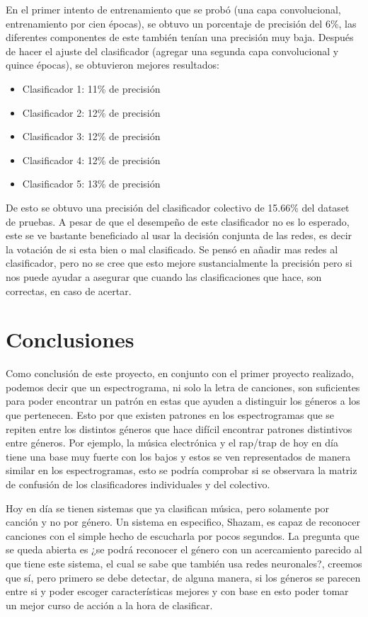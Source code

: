 \documentclass[spanish,11pt,letterpaper]{article}
\begin{document}
En el primer intento de entrenamiento que se probó (una capa convolucional, entrenamiento por cien épocas), se obtuvo un porcentaje de precisión del 6\%, las diferentes componentes de este también tenían una precisión muy baja. Después de hacer el ajuste del clasificador (agregar una segunda capa convolucional y quince épocas), se obtuvieron mejores resultados:
\begin{itemize}
\item Clasificador 1: 11\% de precisión
\item Clasificador 2: 12\% de precisión
\item Clasificador 3: 12\% de precisión
\item Clasificador 4: 12\% de precisión
\item Clasificador 5: 13\% de precisión
\end{itemize}

De esto se obtuvo una precisión del clasificador colectivo de 15.66\% del dataset de pruebas. A pesar de que el
desempeño de este clasificador no es lo esperado, este se ve bastante beneficiado al usar la decisión conjunta de
las redes, es decir la votación de si esta bien o mal clasificado. Se pensó en añadir mas redes al clasificador,
pero no se cree que esto mejore sustancialmente la precisión pero si nos puede ayudar a asegurar que cuando las
clasificaciones que hace, son correctas, en caso de acertar.

\section{Conclusiones}

Como conclusión de este proyecto, en conjunto con el primer proyecto realizado, podemos decir que un
espectrograma, ni solo la letra de canciones, son suficientes para poder encontrar un patrón en estas que ayuden a
distinguir los géneros a los que pertenecen. Esto por que existen patrones en los espectrogramas que se repiten
entre los distintos géneros que hace difícil encontrar patrones distintivos entre géneros. Por ejemplo, la música
electrónica y el rap/trap de hoy en día tiene una base muy fuerte con los bajos y estos se ven representados de
manera similar en los espectrogramas, esto se podría comprobar si se observara la matriz de confusión de los clasificadores individuales y del colectivo.

Hoy en día se tienen sistemas que ya clasifican música, pero solamente por canción y no por género. Un sistema en
especifico, Shazam, es capaz de reconocer canciones con el simple hecho de escucharla por pocos segundos. La
pregunta que se queda abierta es ¿se podrá reconocer el género con un acercamiento parecido al que tiene este
sistema, el cual se sabe que también usa redes neuronales?, creemos que sí, pero primero se debe detectar, de
alguna manera, si los géneros se parecen entre si y poder escoger características mejores y con base en esto poder
tomar un mejor curso de acción a la hora de clasificar.
\end{document}

